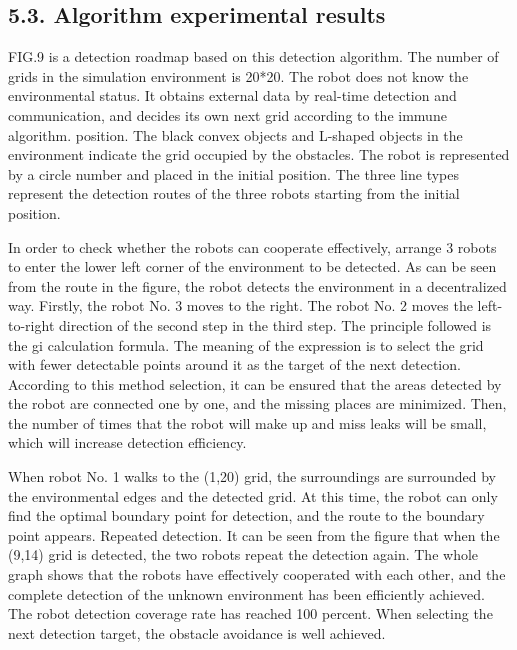 \documentclass[Proceedings]{ascelike}
\begin{document}
\subsection{5.3. Algorithm experimental results}
FIG.9 is a detection roadmap based on this detection algorithm. The number of grids in the simulation environment is 20*20. The robot does not know the environmental status. It obtains external data by real-time detection and communication, and decides its own next grid according to the immune algorithm. position. The black convex objects and L-shaped objects in the environment indicate the grid occupied by the obstacles. The robot is represented by a circle number and placed in the initial position. The three line types represent the detection routes of the three robots starting from the initial position.
\par
In order to check whether the robots can cooperate effectively, arrange 3 robots to enter the lower left corner of the environment to be detected. As can be seen from the route in the figure, the robot detects the environment in a decentralized way. Firstly, the robot No. 3 moves to the right. The robot No. 2 moves the left-to-right direction of the second step in the third step. The principle followed is the gi calculation formula. The meaning of the expression is to select the grid with fewer detectable points around it as the target of the next detection. According to this method selection, it can be ensured that the areas detected by the robot are connected one by one, and the missing places are minimized. Then, the number of times that the robot will make up and miss leaks will be small, which will increase detection efficiency.
\par
When robot No. 1 walks to the (1,20) grid, the surroundings are surrounded by the environmental edges and the detected grid. At this time, the robot can only find the optimal boundary point for detection, and the route to the boundary point appears. Repeated detection. It can be seen from the figure that when the (9,14) grid is detected, the two robots repeat the detection again. The whole graph shows that the robots have effectively cooperated with each other, and the complete detection of the unknown environment has been efficiently achieved. The robot detection coverage rate has reached 100 percent. When selecting the next detection target, the obstacle avoidance is well achieved.
\end{document}
